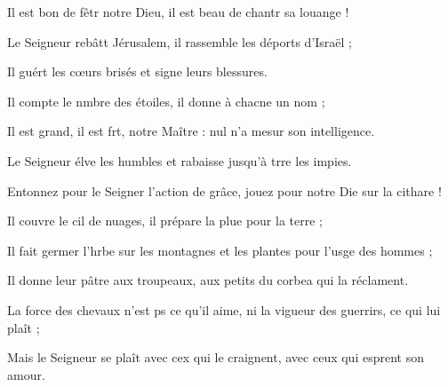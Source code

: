 \item Il est bon de fêtr notre Dieu,\psstar{} il est beau de chantr sa louange !
\item Le Seigneur rebâtt Jérusalem,\psstar{} il rassemble les déports d’Israël ;
\item Il guért les cœurs brisés\psstar{} et signe leurs blessures.
\item Il compte le nmbre des étoiles,\psstar{} il donne à chacne un nom ;
\item Il est grand, il est frt, notre Maître :\psstar{} nul n’a mesur son intelligence.
\item Le Seigneur élve les humbles\psstar{} et rabaisse jusqu’à trre les impies.
\item Entonnez pour le Seigner l’action de grâce,\psstar{} jouez pour notre Die sur la cithare !
\item Il couvre le cil de nuages,\psstar{} il prépare la plue pour la terre ; 
\item Il fait germer l’hrbe sur les montagnes\psstar{} et les plantes pour l’usge des hommes ;
\item Il donne leur pâtre aux troupeaux,\psstar{} aux petits du corbea qui la réclament.
\item La force des chevaux n’est ps ce qu’il aime,\psstar{} ni la vigueur des guerrirs, ce qui lui plaît ;
\item Mais le Seigneur se plaît avec cex qui le craignent,\psstar{} avec ceux qui esprent son amour.